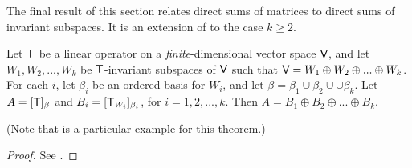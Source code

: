 The final result of this section relates direct sums of matrices to direct sums of invariant subspaces.
It is an extension of  to the case \(k \ge 2\).

\begin{theorem} \label{thm 5.24}
Let \(\textsf{T}\) be a linear operator on a \emph{finite}-dimensional vector space \(\textsf{V}\), and let \(W_1, W_2, ..., W_k\) be \(\textsf{T}\)-invariant subspaces of \(\textsf{V}\) such that \(\textsf{V} = W_1 \oplus W_2 \oplus ... \oplus W_k\).
For each \(i\), let \(\beta_i\) be an ordered basis for \(W_i\), and let \(\beta = \beta_1 \cup \beta_2 \cup \cup \beta_k\). Let \(A = [\textsf{T}]_{\beta}\) and \(B_i = [\textsf{T}_{W_i}]_{\beta_i}\), for \(i = 1, 2, ..., k\).
Then \(A = B_1 \oplus B_2 \oplus ... \oplus B_k\).

(Note that  is a particular example for this theorem.)
\end{theorem}

\begin{proof}
See .
\end{proof}
